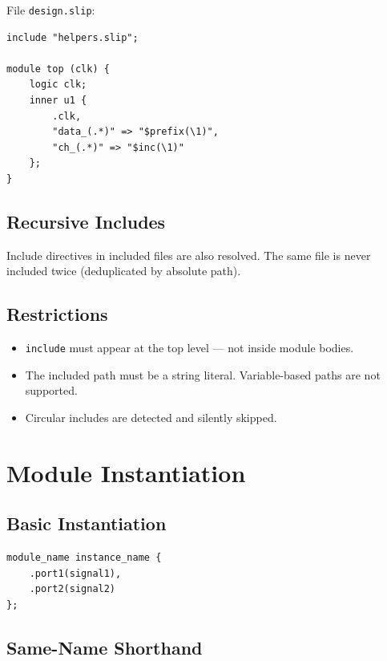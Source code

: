 \documentclass[lang=en,11pt]{elegantbook}
\newcommand{\code}[1]{\texttt{#1}}
\begin{document}
File \code{design.slip}:

\begin{lstlisting}[language=Slip]
include "helpers.slip";

module top (clk) {
    logic clk;
    inner u1 {
        .clk,
        "data_(.*)" => "$prefix(\1)",
        "ch_(.*)" => "$inc(\1)"
    };
}
\end{lstlisting}

\section{Recursive Includes}

Include directives in included files are also resolved. The same file is never included twice (deduplicated by absolute path).

\section{Restrictions}

\begin{itemize}
  \item \code{include} must appear at the top level --- not inside module bodies.
  \item The included path must be a string literal. Variable-based paths are not supported.
  \item Circular includes are detected and silently skipped.
\end{itemize}

\chapter{Module Instantiation}

\section{Basic Instantiation}

\begin{lstlisting}[language=Slip]
module_name instance_name {
    .port1(signal1),
    .port2(signal2)
};
\end{lstlisting}

\section{Same-Name Shorthand}
\end{document}
